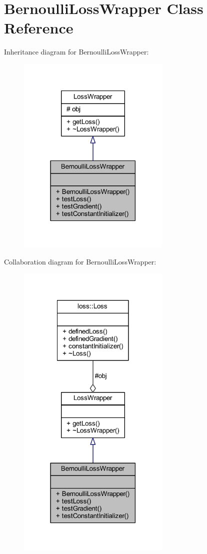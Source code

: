 \hypertarget{class_bernoulli_loss_wrapper}{}\section{Bernoulli\+Loss\+Wrapper Class Reference}
\label{class_bernoulli_loss_wrapper}


Inheritance diagram for Bernoulli\+Loss\+Wrapper\+:\nopagebreak
\begin{figure}[H]
\begin{center}
\leavevmode
\includegraphics[width=207pt]{class_bernoulli_loss_wrapper__inherit__graph}
\end{center}
\end{figure}


Collaboration diagram for Bernoulli\+Loss\+Wrapper\+:\nopagebreak
\begin{figure}[H]
\begin{center}
\leavevmode
\includegraphics[width=207pt]{class_bernoulli_loss_wrapper__coll__graph}
\end{center}
\end{figure}

